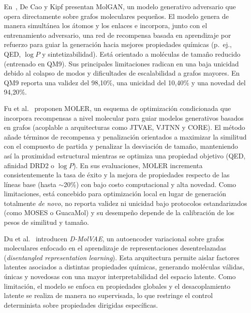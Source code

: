En~\cite{DeCaoKipf2018MolGAN}, De Cao y Kipf presentan MolGAN, un modelo generativo adversario que opera directamente sobre grafos moleculares pequeños. El modelo genera de manera simultánea los átomos y los enlaces e incorpora, junto con el entrenamiento adversario, una red de recompensa basada en aprendizaje por refuerzo para guiar la generación hacia mejores propiedades químicas (p.~ej., QED, $\log P$ y sintetizabilidad). Está orientado a moléculas de tamaño reducido (entrenado en QM9). Sus principales limitaciones radican en una baja unicidad debido al colapso de modos y dificultades de escalabilidad a grafos mayores. En QM9 reporta una validez del 98,10\%, una unicidad del 10,40\% y una novedad del 94,20\%.

Fu et al.~\cite{Fu2022MOLER} proponen MOLER, un esquema de optimización condicionada que incorpora recompensas a nivel molecular para guiar modelos generativos basados en grafos (acoplable a arquitecturas como JTVAE, VJTNN y CORE). El método añade términos de recompensa y penalización orientados a maximizar la similitud con el compuesto de partida y penalizar la desviación de tamaño, manteniendo así la proximidad estructural mientras se optimiza una propiedad objetivo (QED, afinidad DRD2 o $\log P$). En sus evaluaciones, MOLER incrementa consistentemente la tasa de éxito y la mejora de propiedades respecto de las líneas base (hasta $\sim$20\%) con bajo costo computacional y alta novedad. Como limitaciones, está concebido para optimización local en lugar de generación totalmente \textit{de novo}, no reporta validez ni unicidad bajo protocolos estandarizados (como MOSES o GuacaMol) y su desempeño depende de la calibración de los pesos de similitud y tamaño.

Du et al.~\cite{DGMWSZ22} introducen \textit{D-MolVAE}, un autoencoder variacional sobre grafos moleculares enfocado en el aprendizaje de representaciones desentrelazadas (\textit{disentangled representation learning}). Esta arquitectura permite aislar factores latentes asociados a distintas propiedades químicas, generando moléculas válidas, únicas y novedosas con una mayor interpretabilidad del espacio latente. Como limitación, el modelo se enfoca en propiedades globales y el desacoplamiento latente se realiza de manera no supervisada, lo que restringe el control determinista sobre propiedades dirigidas específicas.

